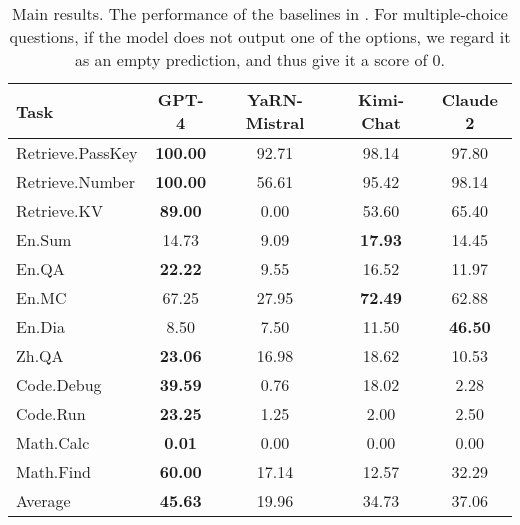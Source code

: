 \begin{table*}[!ht]
    \centering
    \begin{tabular}{l|cccc}
        \toprule
        \textbf{Task}    
            &  \textbf{GPT-4}    
            &  \textbf{YaRN-Mistral}   
            &  \textbf{Kimi-Chat}    
            &  \textbf{Claude 2}   \\
        \midrule
        Retrieve.PassKey     
            & \textbf{100.00}            
            & 92.71              
            & 98.14        
            & 97.80          \\
        Retrieve.Number      
            & \textbf{100.00}            
            & 56.61              
            & 95.42        
            & 98.14          \\
        Retrieve.KV          
            & \textbf{89.00}          
            & 0.00   
            & 53.60        
            & 65.40       \\  
        En.Sum               
            & 14.73           
            & 9.09   
            & \textbf{17.93}         
            & 14.45          \\
        En.QA                
            & \textbf{22.22}          
            & 9.55              
            & 16.52        
            & 11.97          \\
        En.MC                
            & 67.25         
            & 27.95              
            & \textbf{72.49}        
            & 62.88         \\
        En.Dia               
            & 8.50           
            & 7.50               
            & 11.50        
            & \textbf{46.50}  \\
         Zh.QA                
            & \textbf{23.06}          
            & 16.98              
            & 18.62        
            & 10.53    \\
         Code.Debug           
            & \textbf{39.59}          
            & 0.76   
            & 18.02       
            & 2.28   \\
         Code.Run             
            & \textbf{23.25}          
            &  1.25   
            &  2.00   
            &  2.50   \\
         Math.Calc            
            & \textbf{0.01} 
            & 0.00  
            & 0.00  
            & 0.00   \\
         Math.Find            
            & \textbf{60.00}          
            & 17.14              
            & 12.57        
            & 32.29    \\
        \midrule
        Average
        & \textbf{45.63}
        & 19.96
        & 34.73
        & 37.06\\
        \bottomrule
    \end{tabular}
    \caption{Main results. The performance of the baselines in \OURS. For multiple-choice questions, if the model does not output one of the options, we regard it as an empty prediction, and thus give it a score of 0.}
    \label{tab:main-results}
\end{table*}

